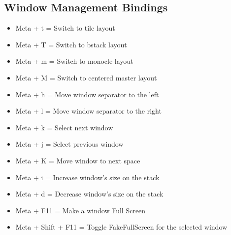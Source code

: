 \documentclass[12pt, a4paper]{article}
\begin{document}
\subsection{Window Management Bindings}
\begin{itemize}
    \item Meta + t      = Switch to tile layout
    \item Meta + T      = Switch to bstack layout
    \item Meta + m      = Switch to monocle layout
    \item Meta + M      = Switch to centered master layout
    \item Meta + h      = Move window separator to the left
    \item Meta + l      = Move window separator to the right
    \item Meta + k      = Select next window
    \item Meta + j      = Select previous window
    \item Meta + K      = Move window to next space
    \item Meta + i      = Increase window's size on the stack
    \item Meta + d      = Decrease window's size on the stack
    \item Meta + F11    = Make a window Full Screen
    \item Meta + Shift + F11    = Toggle FakeFullScreen for the selected window
\end{itemize}
\end{document}
